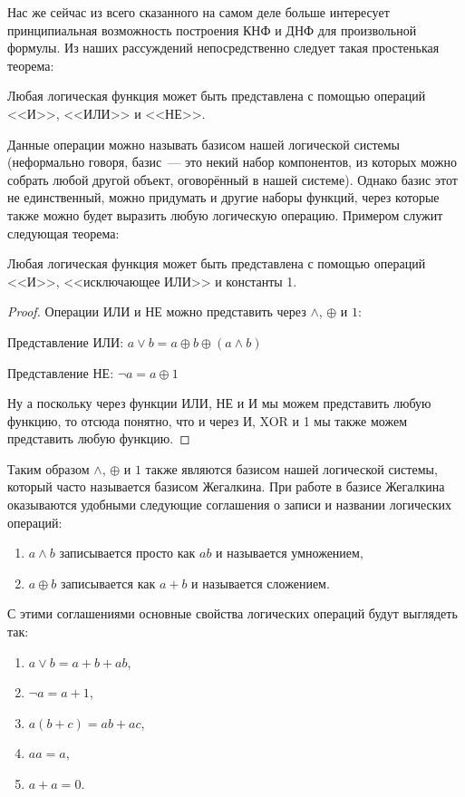 Нас же сейчас из всего сказанного на самом деле больше интересует принципиальная возможность построения КНФ и ДНФ для произвольной формулы. Из наших рассуждений непосредственно следует такая простенькая теорема:

\begin{thm}Любая логическая функция может быть представлена с помощью операций <<И>>, <<ИЛИ>> и <<НЕ>>.\end{thm}

Данные операции можно называть базисом нашей логической системы (неформально говоря, базис~--- это некий набор компонентов, из которых можно собрать любой другой объект, оговорённый в нашей системе). Однако базис этот не единственный, можно придумать и другие наборы функций, через которые \mbox{также} можно будет выразить любую логическую операцию. Примером служит следующая теорема:

\begin{thm}Любая логическая функция может быть представлена с помощью операций <<И>>, <<исключающее ИЛИ>> и константы 1.\end{thm}

\begin{proof}Операции ИЛИ и НЕ можно представить через $\land$, $\oplus$ и $1$:

Представление ИЛИ: $a\lor b = a \oplus b \oplus (a\land b)$

Представление НЕ: $\neg a = a \oplus 1$

Ну а поскольку через функции ИЛИ, НЕ и И мы можем представить любую функцию, то отсюда понятно, что и через И, XOR и 1 мы также можем представить любую функцию.\end{proof}

Таким образом $\land$, $\oplus$ и $1$ также являются базисом нашей логической системы, который часто называется базисом Жегалкина. При работе в базисе Жегалкина оказываются удобными следующие соглашения о записи и названии логических операций:

\begin{enumerate}
\item $a\land b$ записывается просто как $ab$ и называется умножением,
\item $a \oplus b$ записывается как $a + b$ и называется сложением.
\end{enumerate}

С этими соглашениями основные свойства логических операций будут выглядеть так:

\begin{enumerate}
\item $a\lor b=a + b +ab$,
\item $\neg a = a + 1$,
\item $a(b+c) = ab + ac$,
\item $aa = a$,
\item $a + a = 0$.
\end{enumerate}

